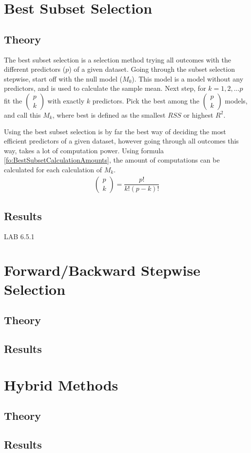 \section{Best Subset Selection}
\subsection{Theory}
The best subset selection is a selection method trying all outcomes with the different predictors ($p$) of a given dataset. Going through the subset selection stepwise, start off with the null model ($M_0$). This model is a model without any predictors, and is used to calculate the sample mean. Next step, for $k = 1, 2, \dots p$ fit the $( \begin{smallmatrix} p \\ k \end{smallmatrix} )$ with exactly $k$ predictors. Pick the best among the $( \begin{smallmatrix} p \\ k \end{smallmatrix} )$ models, and call this $M_k$, where best is defined as the smallest $RSS$ or highest $R^2$.

Using the best subset selection is by far the best way of deciding the most efficient predictors of a given dataset, however going through all outcomes this way, takes a lot of computation power. Using formula \ref{fo:BestSubsetCalculationAmounts}, the amount of computations can be calculated for each calculation of $M_k$.
\begin{align}\label{fo:BestSubsetCalculationAmounts}
	\begin{pmatrix}
		p \\ k
	\end{pmatrix}
	= \dfrac{p!}{k!(p-k)!}
\end{align}

\subsection{Results}
LAB 6.5.1

\section{Forward/Backward Stepwise Selection}
\subsection{Theory}
\subsection{Results}

\section{Hybrid Methods}
\subsection{Theory}
\subsection{Results}